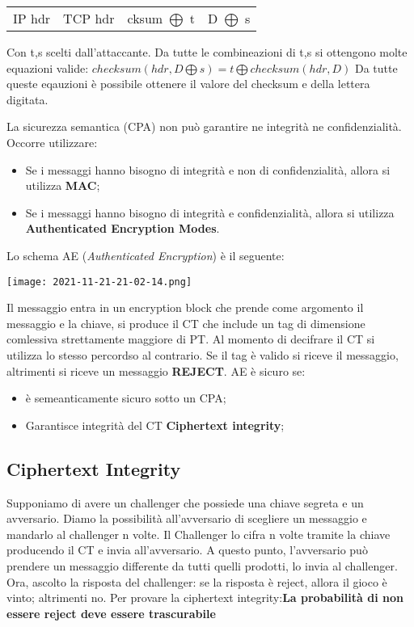 \documentclass{article}
\theoremstyle{remark}
\begin{document}
\begin{itemize}
\begin{itemize}
\begin{center}
			            \begin{tabular}{|c|c|c|c|}
				            IP hdr & TCP hdr & cksum $\bigoplus$ t & D $\bigoplus$ s \\
			            \end{tabular}
		            \end{center}
		            Con t,s scelti dall'attaccante. Da tutte le combineazioni di t,s si ottengono molte equazioni valide:
		            \newline\(checksum(hdr,D\bigoplus s)=t\bigoplus checksum(hdr,D)\)\newline
		            Da tutte queste eqauzioni è possibile ottenere il valore del checksum e della lettera digitata.
	      \end{itemize}
\end{itemize}
La sicurezza semantica (CPA) non può garantire ne integrità ne confidenzialità. Occorre utilizzare:
\begin{itemize}
	\item Se i messaggi hanno bisogno di integrità e non di confidenzialità, allora si utilizza \textbf{MAC};
	\item Se i messaggi hanno bisogno di integrità e confidenzialità, allora si utilizza \textbf{Authenticated Encryption Modes}.
\end{itemize}
Lo schema AE (\emph{Authenticated Encryption}) è il seguente:
\begin{center}
	\texttt{[image: 2021-11-21-21-02-14.png]}
\end{center}
Il messaggio entra in un encryption block che prende come argomento il messaggio e la chiave, si produce il CT che include un tag
di dimensione comlessiva strettamente maggiore di PT. Al momento di decifrare il CT si utilizza lo stesso percordso al contrario.
Se il tag è valido si riceve il messaggio, altrimenti si riceve un messaggio \textbf{REJECT}.\newline
AE è sicuro se:
\begin{itemize}
	\item è semeanticamente sicuro sotto un CPA;
	\item Garantisce integrità del CT \textbf{Ciphertext integrity};
\end{itemize}
\subsection{Ciphertext Integrity}
Supponiamo di avere un challenger che possiede una chiave segreta e un avversario. Diamo la possibilità all'avversario di
scegliere un messaggio e mandarlo al challenger n volte. Il Challenger lo cifra n volte tramite la chiave producendo il CT
e invia all'avversario. A questo punto, l'avversario può prendere un messaggio differente da tutti quelli prodotti, lo invia
al challenger. Ora, ascolto la risposta del challenger: se la risposta è reject, allora il gioco è vinto; altrimenti no.\newline
Per provare la ciphertext integrity:\textbf{La probabilità di non essere reject deve essere trascurabile}\newline
\end{document}
